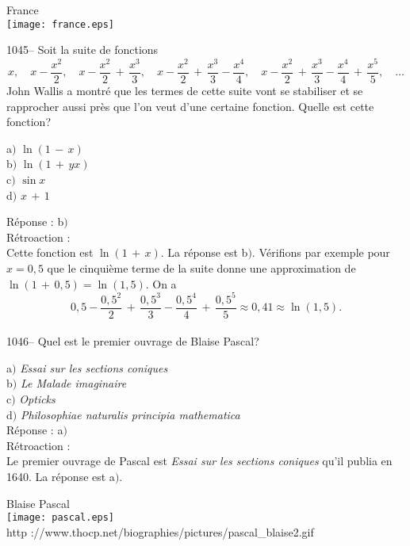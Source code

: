 ﻿\documentclass[letterpaper, 12pt]{article}
\begin{document}
        \begin{center}
        France\\
    \texttt{[image: france.eps]}\\
    \end{center}

1045-- Soit la suite de fonctions
$$\displaystyle{x,\quad x-\frac{x^2}2,\quad
x-\frac{x^2}2\,+\,\frac{x^3}3,\quad
x-\frac{x^2}2\,+\,\frac{x^3}3-\frac{x^4}4,\quad
x-\frac{x^2}2\,+\,\frac{x^3}3-\frac{x^4}4\,+\,\frac{x^5}5,\quad\ldots}$$
John Wallis a montr\'e que les termes de cette suite vont se
stabiliser et se rapprocher aussi pr\`es que l'on veut d'une
certaine fonction. Quelle est cette fonction?

a$)$ $\ln(1\,-\,x)$ \\
b$)$ $\ln(1\,+\,yx)$  \\
c$)$ $\sin x$  \\
d$)$ $x\,+\,1$

R\'eponse : b$)$\\

R\'etroaction : \\
Cette fonction est $\ln(1\,+\,x)$. La r\'eponse est b$)$.
V\'erifions par exemple pour $x=0,5$ que le cinqui\`eme terme de la
suite donne une approximation de $\ln(1\,+\,0,5)=\ln(1,5)$. On a
$$0,5-\frac{0,5^2}2\,+\,\frac{0,5^3}3-\frac{0,5^4}4\,+\,\frac{0,5^5}5\approx0,41\approx\ln(1,5).$$
\\

1046-- Quel est le premier ouvrage de Blaise Pascal?

a$)$ {\sl Essai sur les sections coniques} \\
b$)$ {\sl Le Malade imaginaire}  \\
c$)$ {\sl Opticks}  \\
d$)$ {\sl Philosophiae naturalis principia mathematica}\\

R\'eponse : a$)$\\

R\'etroaction : \\
Le premier ouvrage de Pascal est {\sl Essai sur les sections
coniques} qu'il publia en 1640. La r\'eponse est a$)$.

        \begin{center}
        Blaise Pascal\\
    \texttt{[image: pascal.eps]}\\
        {\footnotesize http
://www.thocp.net/biographies/pictures/pascal\_blaise2.gif}
    \end{center}
\end{document}
